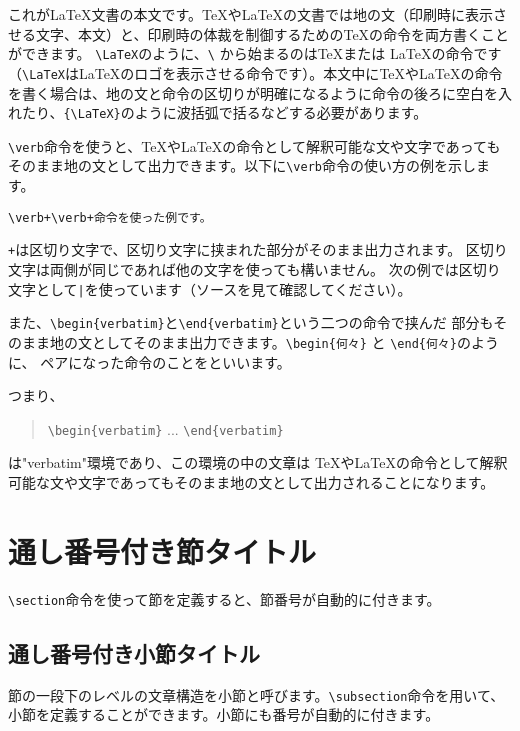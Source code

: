 \documentclass[platex,a4paper,12pt,dvipdfmx]{jsarticle}
\begin{document}
\tableofcontents
\newpage
これが\LaTeX 文書の本文です。\TeX や\LaTeX の文書では地の文（印刷時に表示させる文字、本文）と、印刷時の体裁を制御するための\TeX の命令を両方書くことができます。
\verb+\LaTeX+のように、\verb+\+ から始まるのは\TeX または \LaTeX の命令です（\verb+\LaTeX+は\LaTeX のロゴを表示させる命令です）。本文中に{\TeX}や{\LaTeX}の命令を書く場合は、地の文と命令の区切りが明確になるように命令の後ろに空白を入れたり、\verb+{\LaTeX}+のように波括弧で括るなどする必要があります。

\verb+\verb+命令を使うと、{\TeX}や{\LaTeX}の命令として解釈可能な文や文字であってもそのまま地の文として出力できます。以下に\verb+\verb+命令の使い方の例を示します。

\begin{verbatim}
\verb+\verb+命令を使った例です。
\end{verbatim}

\texttt{+}は区切り文字で、区切り文字に挟まれた部分がそのまま出力されます。
区切り文字は両側が同じであれば他の文字を使っても構いません。
次の例では区切り文字として\texttt{|}を使っています（ソースを見て確認してください）。

また、\verb|\begin{verbatim}|と\verb+\end{verbatim}+という二つの命令で挟んだ
部分もそのまま地の文としてそのまま出力できます。\verb+\begin{何々}+ と \verb+\end{何々}+のように、
ペアになった命令のことをといいます。

つまり、
\begin{quote}
 \verb+\begin{verbatim}+ ... \verb+\end{verbatim}+
\end{quote}
は"verbatim"環境であり、この環境の中の文章は
{\TeX}や{\LaTeX}の命令として解釈可能な文や文字であってもそのまま地の文として出力されることになります。

\section{通し番号付き節タイトル}
\verb+\section+命令を使って節を定義すると、節番号が自動的に付きます。

\subsection{通し番号付き小節タイトル}
節の一段下のレベルの文章構造を小節と呼びます。\verb+\subsection+命令を用いて、小節を定義することができます。小節にも番号が自動的に付きます。
\end{document}
